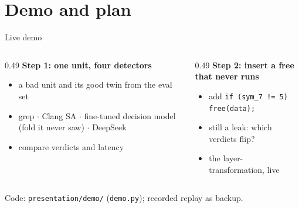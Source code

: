 \section{Demo and plan}

\begin{frame}{Live demo}
  \begin{columns}[T]
    \begin{column}{0.49\textwidth}
      \textbf{Step 1: one unit, four detectors}
      \begin{itemize}
        \item a bad unit and its good twin from the eval set
        \item grep $\cdot$ Clang SA $\cdot$ fine-tuned decision model (fold it never saw) $\cdot$ DeepSeek
        \item compare verdicts and latency
      \end{itemize}
    \end{column}
    \begin{column}{0.49\textwidth}
      \textbf{Step 2: insert a free that never runs}
      \begin{itemize}
        \item add {\footnotesize\texttt{if (sym\_7 != 5) free(data);}}
        \item still a leak: which verdicts flip?
        \item the layer- transformation, live
      \end{itemize}
    \end{column}
  \end{columns}
  \vfill
  {\small Code: \texttt{presentation/demo/} (\texttt{demo.py}); recorded replay as backup.}
\end{frame}

